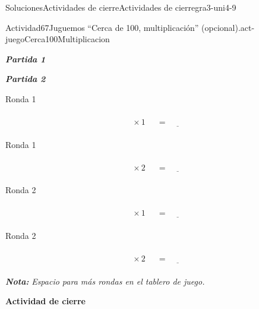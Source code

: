 \documentclass[twoside,10pt,]{article}
\newcommand{\alert}[1]{\textbf{\textit{#1}}}
\begin{document}
\begin{solutions-section}{Soluciones}{Actividades de cierre}{}{Actividades de cierre}{}{}{gra3-uni4-9}
\begin{activitysolution}{Actividad}{67}{Juguemos “Cerca de 100, multiplicación” (opcional).}{act-juegoCerca100Multiplicacion}
\begin{sidebyside}{2}{0}{0}{0.1}
\begin{sbspanel}{0.45}%
\alert{Partida 1}%
\end{sbspanel}%
\begin{sbspanel}{0.45}%
\par
\alert{Partida 2}%
\end{sbspanel}%
\end{sidebyside}%
\begin{sidebyside}{2}{0}{0}{0.1}%
\begin{sbspanel}{0.45}%
Ronda 1%
\par
%
\begin{equation*}
\boxed{\phantom{\frac{00}{00}}} \times 1 \ \boxed{\phantom{\frac{00}{00}}}= \underline{\hspace{1cm}}
\end{equation*}
%
\end{sbspanel}%
\begin{sbspanel}{0.45}%
Ronda 1%
\par
%
\begin{equation*}
\boxed{\phantom{\frac{00}{00}}} \times 2 \ \boxed{\phantom{\frac{00}{00}}}= \underline{\hspace{1cm}}
\end{equation*}
%
\end{sbspanel}%
\end{sidebyside}%
\begin{sidebyside}{2}{0}{0}{0.1}%
\begin{sbspanel}{0.45}%
Ronda 2%
\par
%
\begin{equation*}
\boxed{\phantom{\frac{00}{00}}} \times 1 \ \boxed{\phantom{\frac{00}{00}}}= \underline{\hspace{1cm}}
\end{equation*}
%
\end{sbspanel}%
\begin{sbspanel}{0.45}%
Ronda 2%
\par
%
\begin{equation*}
\boxed{\phantom{\frac{00}{00}}} \times 2 \ \boxed{\phantom{\frac{00}{00}}}= \underline{\hspace{1cm}}
\end{equation*}
%
\end{sbspanel}%
\end{sidebyside}%
\alert{Nota:} \emph{Espacio para más rondas en el tablero de juego.}%
\end{activitysolution}%
\par\medskip
\noindent\textbf{\large{}\space\textperiodcentered\space{}Actividad de cierre}

\end{solutions-section}
\end{document}
